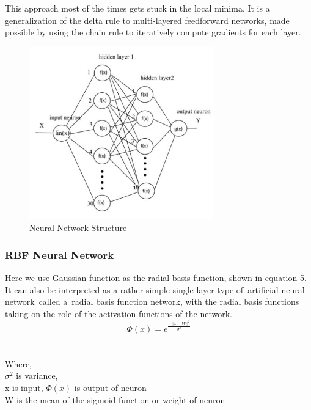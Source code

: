 \documentclass[conference]{IEEEtran}
\begin{document}
This approach most of the times gets stuck in the local minima.  It is a generalization of the delta rule to multi-layered feedforward networks, made possible by using the chain rule to iteratively compute gradients for each layer.
\begin{figure}[h]
\includegraphics[width=8cm]{net.png}
\centering
\caption{Neural Network Structure}\label{net_img}
\end{figure}
\subsubsection{RBF Neural Network}
Here we use Gaussian function as the radial basis function, shown in equation 5. It can also be interpreted as a rather simple single-layer type of artificial neural network called a radial basis function network, with the radial basis functions taking on the role of the activation functions of the network. 
\begin{equation} \label{eq:3}
\Phi(x) =   {e} ^ {\frac{- {||x-W||} ^ {2}}{{\sigma} ^ {2}}}
\end{equation}\\
\\Where,\\
$\sigma^2$ is variance,\\
x is input, $\Phi(x)$ is output of neuron\\
W is the mean of the sigmoid function or weight of neuron\\
\end{document}
